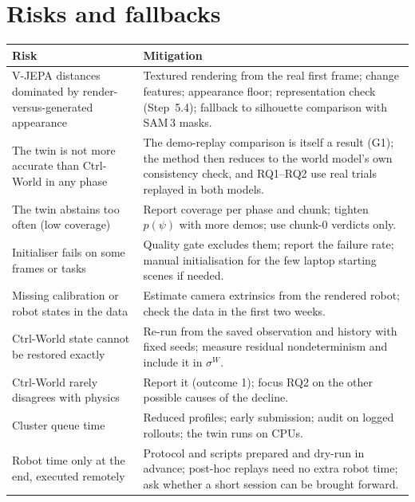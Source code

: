 \documentclass[11pt,a4paper]{article}
\theoremstyle{plain}
\theoremstyle{definition}
\theoremstyle{remark}
\begin{document}
\section{Risks and fallbacks}\label{sec:risks}
\begin{center}\small
\begin{tabularx}{\linewidth}{@{}>{\raggedright\arraybackslash}p{5.2cm}>{\raggedright\arraybackslash}X@{}}
\toprule
\textbf{Risk} & \textbf{Mitigation}\\
\midrule
V-JEPA distances dominated by render-versus-generated appearance & Textured rendering from the real first frame; change features; appearance floor; representation check (Step~5.4); fallback to silhouette comparison with SAM\,3 masks.\\
The twin is not more accurate than Ctrl-World in any phase & The demo-replay comparison is itself a result (G1); the method then reduces to the world model's own consistency check, and RQ1--RQ2 use real trials replayed in both models.\\
The twin abstains too often (low coverage) & Report coverage per phase and chunk; tighten $p(\psi)$ with more demos; use chunk-0 verdicts only.\\
Initialiser fails on some frames or tasks & Quality gate excludes them; report the failure rate; manual initialisation for the few laptop starting scenes if needed.\\
Missing calibration or robot states in the data & Estimate camera extrinsics from the rendered robot; check the data in the first two weeks.\\
Ctrl-World state cannot be restored exactly & Re-run from the saved observation and history with fixed seeds; measure residual nondeterminism and include it in $\sigma^W$.\\
Ctrl-World rarely disagrees with physics & Report it (outcome 1); focus RQ2 on the other possible causes of the decline.\\
Cluster queue time & Reduced profiles; early submission; audit on logged rollouts; the twin runs on CPUs.\\
Robot time only at the end, executed remotely & Protocol and scripts prepared and dry-run in advance; post-hoc replays need no extra robot time; ask whether a short session can be brought forward.\\
\bottomrule
\end{tabularx}
\end{center}
\end{document}
